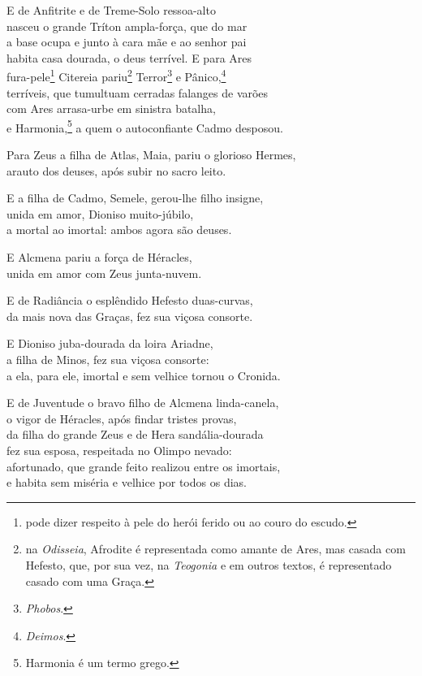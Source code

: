 \quad{}E de Anfitrite e de Treme-Solo ressoa-alto \\
nasceu o grande Tríton ampla-força, que do mar\\
a base ocupa e junto à cara mãe e ao senhor pai\\
habita casa dourada, o deus terrível. E para Ares\\
fura-pele\footnote{pode dizer respeito à pele do herói ferido ou ao
couro do escudo.} Citereia pariu\footnote{na \emph{Odisseia}, Afrodite é representada como amante de Ares, mas casada com Hefesto, que, por sua vez, na \emph{Teogonia} e em outros textos, é representado casado com uma Graça.} Terror\footnote{\emph{Phobos}.} e Pânico,\footnote{\emph{Deimos}.}\\
terríveis, que tumultuam cerradas falanges de varões \\
com Ares arrasa-urbe em sinistra batalha,\\
e Harmonia,\footnote{Harmonia é um termo grego.} a quem o autoconfiante Cadmo desposou.

\quad{}Para Zeus a filha de Atlas, Maia, pariu o glorioso Hermes,\\
arauto dos deuses, após subir no sacro leito.

\quad{}E a filha de Cadmo, Semele, gerou-lhe filho insigne, \\
unida em amor, Dioniso muito-júbilo,\\
a mortal ao imortal: ambos agora são deuses.

\quad{}E Alcmena pariu a força de Héracles,\\
unida em amor com Zeus junta-nuvem.

\quad{}E de Radiância o esplêndido Hefesto duas-curvas, \\
da mais nova das Graças, fez sua viçosa consorte.

\quad{}E Dioniso juba-dourada da loira Ariadne,\\
a filha de Minos, fez sua viçosa consorte:\\
a ela, para ele, imortal e sem velhice tornou o Cronida.

\quad{}E de Juventude o bravo filho de Alcmena linda-canela, \\
o vigor de Héracles, após findar tristes provas,\\
da filha do grande Zeus e de Hera sandália-dourada\\
fez sua esposa, respeitada no Olimpo nevado:\\
afortunado, que grande feito realizou entre os imortais,\\
e habita sem miséria e velhice por todos os dias. 

